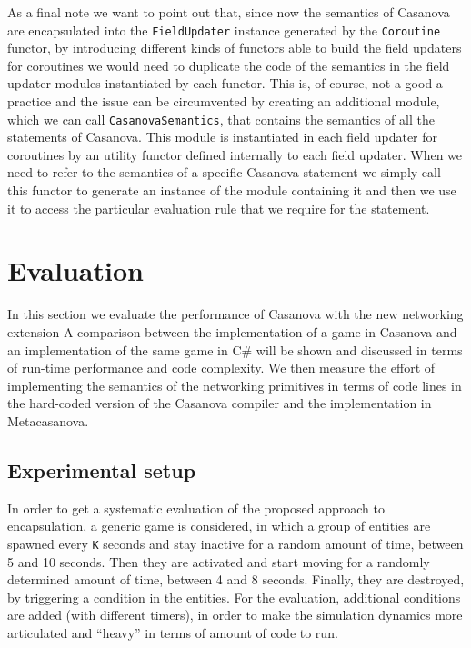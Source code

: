 \noindent
As a final note we want to point out that, since now the semantics of Casanova are encapsulated into the \texttt{FieldUpdater} instance generated by the \texttt{Coroutine} functor, by introducing different kinds of functors able to build the field updaters for coroutines we would need to duplicate the code of the semantics in the field updater modules instantiated by each functor. This is, of course, not a good a practice and the issue can be circumvented by creating an additional module, which we can call \texttt{CasanovaSemantics}, that contains the semantics of all the statements of Casanova. This module is instantiated in each field updater for coroutines by an utility functor defined internally to each field updater. When we need to refer to the semantics of a specific Casanova statement we simply call this functor to generate an instance of the module containing it and then we use it to access the particular evaluation rule that we require for the statement.

\section{Evaluation}
\label{sec:ch_networking_evaluation}
In this section we evaluate the performance of Casanova with the new networking extension A comparison between the implementation of a game in Casanova and an implementation of the same game in C\# will be shown and discussed in terms of run-time performance and code complexity. We then measure the effort of implementing the semantics of the networking primitives in terms of code lines in the hard-coded version of the Casanova compiler and the implementation in Metacasanova.

\subsection{Experimental setup} In order to get a systematic evaluation of the proposed approach to encapsulation, a generic game is considered, in which a group of entities are spawned every \texttt{K} seconds and stay inactive for a random amount of time, between 5 and 10 seconds. Then they are activated and start moving for a randomly determined amount of time, between 4 and 8 seconds. Finally, they are destroyed, by triggering a condition in the entities. For the evaluation, additional conditions are added (with different timers), in order to make the simulation dynamics more articulated and ``heavy'' in terms of amount of code to run.


